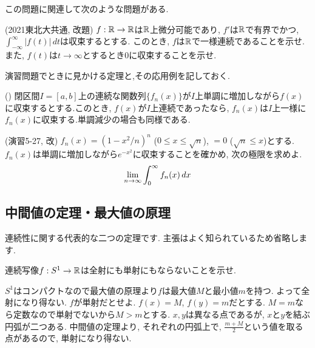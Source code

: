 この問題に関連して次のような問題がある.
\begin{egprob} (2021東北大共通, 改題)
$f:\mathbb{R}\to\mathbb{R}$は$\mathbb{R}$上微分可能であり, $f'$は$\mathbb{R}$で有界でかつ, $\int_{-\infty}^{\infty} |f(t)|\, dt$は収束するとする. このとき, $f$は$\mathbb{R}$で一様連続であることを示せ. また, $f(t)$は$t\to \infty$とするとき0に収束することを示せ.
\end{egprob}
\begin{egans}
\end{egans}



演習問題でときに見かける定理と,その応用例を記しておく.
\begin{theo} () \label{theo:Dini_theorem}
閉区間$I=[a,b]$上の連続な関数列$\{ f_n(x)\}$が$I$上単調に増加しながら$f(x)$に収束するとする.このとき, $f(x)$が$I$上連続であったなら, $f_n(x)$は$I$上一様に$f_n(x)$に収束する.単調減少の場合も同様である.
\end{theo}
\begin{egprob} (\cite{rikou}演習5-27, 改)
$f_n(x) = (1-x^2/n)^{n}$ ($0\leq x\leq \sqrt{n}$), $=0$ ($\sqrt{n}\leq x$)とする.$f_n(x)$は単調に増加しながら$e^{-x^2}$に収束することを確かめ, 次の極限を求めよ.
\[\displaystyle\lim_{n\to \infty} \int_{0}^{\infty} f_n(x)\, dx\]
\end{egprob}
\begin{egans}
\end{egans}


\subsection{中間値の定理・最大値の原理}
連続性に関する代表的な二つの定理です. 主張はよく知られているため省略します.
\begin{egprob}
連続写像$f:S^1\to \mathbb{R}$は全射にも単射にもならないことを示せ.
\end{egprob}
\begin{egans}
$S^1$はコンパクトなので最大値の原理より$f$は最大値$M$と最小値$m$を持つ. よって全射になり得ない. $f$が単射だとせよ. $f(x) = M$, $f(y) = m$だとする. $M=m$なら定数なので単射でないから$M>m$とする. $x,y$は異なる点であるが, $x$と$y$を結ぶ円弧が二つある. 中間値の定理より, それぞれの円弧上で, $\frac{m+M}{2}$という値を取る点があるので, 単射になり得ない.
\end{egans}







